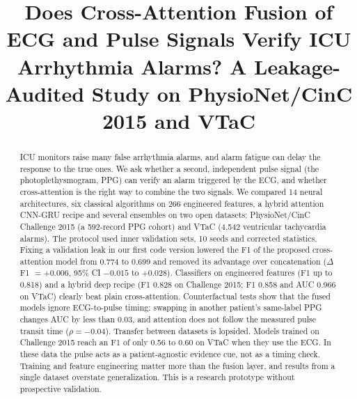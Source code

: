 \documentclass[conference]{IEEEtran}
\begin{document}
\title{Does Cross-Attention Fusion of ECG and Pulse Signals Verify ICU Arrhythmia Alarms? A Leakage-Audited Study on PhysioNet/CinC 2015 and VTaC}

\author{
}

\maketitle

\begin{abstract}
ICU monitors raise many false arrhythmia alarms, and alarm fatigue can delay the response to the true ones. We ask whether a second, independent pulse signal (the photoplethysmogram, PPG) can verify an alarm triggered by the ECG, and whether cross-attention is the right way to combine the two signals. We compared 14 neural architectures, six classical algorithms on 266 engineered features, a hybrid attention CNN-GRU recipe and several ensembles on two open datasets: PhysioNet/CinC Challenge 2015 (a 592-record PPG cohort) and VTaC (4,542 ventricular tachycardia alarms). The protocol used inner validation sets, 10 seeds and corrected statistics. Fixing a validation leak in our first code version lowered the F1 of the proposed cross-attention model from 0.774 to 0.699 and removed its advantage over concatenation ($\Delta$F1 $=+0.006$, 95\% CI $-0.015$ to $+0.028$). Classifiers on engineered features (F1 up to 0.818) and a hybrid deep recipe (F1 0.828 on Challenge 2015; F1 0.858 and AUC 0.966 on VTaC) clearly beat plain cross-attention. Counterfactual tests show that the fused models ignore ECG-to-pulse timing: swapping in another patient's same-label PPG changes AUC by less than 0.03, and attention does not follow the measured pulse transit time ($\rho=-0.04$). Transfer between datasets is lopsided. Models trained on Challenge 2015 reach an F1 of only 0.56 to 0.60 on VTaC when they use the ECG. In these data the pulse acts as a patient-agnostic evidence cue, not as a timing check. Training and feature engineering matter more than the fusion layer, and results from a single dataset overstate generalization. This is a research prototype without prospective validation.
\end{abstract}
\end{document}
